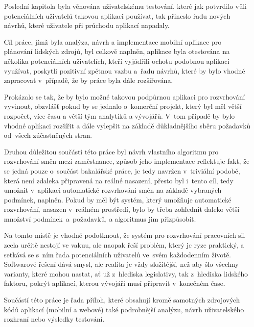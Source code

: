 \documentclass[a4paper,11pt,openany,twoside]{book}
\begin{document}
Poslední kapitola byla věnována uživatelskému testování, které jak potvrdilo vůli potenciálních uživatelů takovou aplikaci používat, tak přineslo řadu nových návrhů, které uživatele při průchodu aplikací napadaly.

Cíl práce, jímž byla analýza, návrh a implementace mobilní aplikace pro plánování lidských zdrojů, byl celkově naplněn, aplikace byla otestována na několika potenciálních uživatelích, kteří vyjádřili ochotu podobnou aplikaci využívat, poskytli pozitivní zpětnou vazbu a~řadu návrhů, které by bylo vhodné zapracovat v~případě, že by práce byla dále rozšiřována.

Prokázalo se tak, že by bylo možné takovou podpůrnou aplikaci pro rozvrhování vyvinout, obzvlášť pokud by se jednalo o~komerční projekt, který byl měl větší rozpočet, více času a větší tým analytiků a vývojářů. V~tom případě by bylo vhodné aplikaci rozšířit a dále vylepšit na základě důkladnějšího sběru požadavků od~všech zúčastněných stran.

Druhou důležitou součástí této práce byl návrh vlastního algoritmu pro rozvrhování směn mezi zaměstnance, způsob jeho implementace reflektuje fakt, že se jedná pouze o~součást bakalářské práce, je tedy navržen v~triviální podobě, která není zdaleka připravená na reálné nasazení, přesto byl i~tento cíl, tedy umožnit v~aplikaci automatické rozvrhování směn na základě vybraných podmínek, naplněn. Pokud by měl být systém, který umožňuje automatické rozvrhování, nasazen v~reálném prostředí, bylo by třeba zohlednit daleko větší množství podmínek~a~požadavků, a algoritmus jim přizpůsobit.

Na tomto místě je vhodné podotknout, že systém pro rozvrhování pracovních sil zcela určitě nestojí ve vakuu, ale naopak řeší problém, který je ryze praktický, a setkává se s~ním řada potenciálních uživatelů ve~svém každodenním životě. Softwarové řešení dává smysl, ale realita je vždy složitější, než aby šlo všechny varianty, které mohou nastat, ať už z~hlediska legislativy, tak z~hlediska lidského faktoru, pokrýt aplikací, kterou vývojáři musí připravit v~konečném čase.

Součástí této práce je řada příloh, které obsahují kromě samotných zdrojových kódů aplikací (mobilní a webové) také podrobnější analýzu, návrh uživatelského rozhraní nebo výsledky testování.





\printbibliography[heading=bibintoc]

\newpage %
\appendix %


\end{document}

